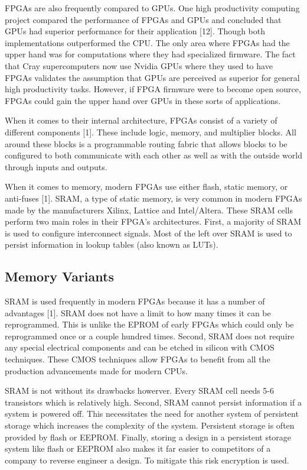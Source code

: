 \documentclass{article}
\begin{document}
    FPGAs are also frequently compared to GPUs. One high productivity computing project
    compared the performance of FPGAs and GPUs and concluded that GPUs had superior performance
    for their application [12].
    Though both implementations outperformed the CPU.
    The only area where FPGAs had the upper hand was for computations where they had
    specialized firmware.
    The fact that Cray supercomputers now use Nvidia GPUs where they used to have FPGAs
    validates the assumption that GPUs are perceived as superior for general high productivity tasks.
    However, if FPGA firmware were to become open source, FPGAs could gain the upper
    hand over GPUs in these sorts of applications.

    When it comes to their internal architecture, FPGAs consist of a variety of different
    components [1]. These include logic, memory, and multiplier blocks. All around these
    blocks is a programmable routing fabric that allows blocks to be configured to both
    communicate with each other as well as with the outside world through inputs and outputs.

    When it comes to memory, modern FPGAs use either flash, static memory, or anti-fuses [1].
    SRAM, a type of static memory, is very common in modern FPGAs made by the manufacturers
    Xilinx, Lattice and Intel/Altera. These SRAM cells perform two main roles in their FPGA's
    architectures. First, a majority of SRAM is used to configure interconnect signals.
    Most of the left over SRAM is used to persist information in lookup tables (also known as
    LUTs).

    \subsection{Memory Variants}

    SRAM is used frequently in modern FPGAs because it has a number of advantages [1]. SRAM
    does not have a limit to how many times it can be reprogrammed. This is unlike the
    EPROM of early FPGAs which could only be reprogrammed once or a couple hundred times.
    Second, SRAM does not require any special electrical components and can be etched
    in silicon with CMOS techniques. These CMOS techniques allow FPGAs to benefit from
    all the production advancements made for modern CPUs.

    SRAM is not without its drawbacks howerver. Every SRAM cell needs 5-6 transistors
    which is relatively high. Second, SRAM cannot persist information if a system is powered
    off. This necessitates the need for another system of persistent storage which increases
    the complexity of the system. Persistent storage is often provided by flash or EEPROM.
    Finally, storing a design in a persistent storage system like flash or EEPROM also
    makes it far easier to competitors of a company to reverse engineer a design.
    To mitigate this risk encryption is used.
\end{document}
